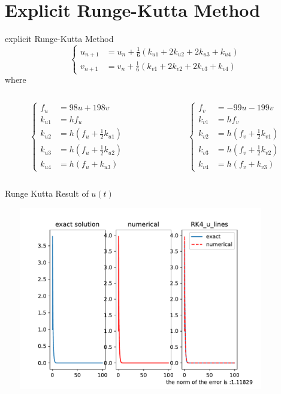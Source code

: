 \documentclass{beamer}
\begin{document}
 \section{Explicit Runge-Kutta Method}
 \begin{frame}{explicit Runge-Kutta Method}
    \[
        \begin{cases}
            u_{n+1} &= u_n +\frac{1}{6}(k_{u1}+2k_{u2}+2k_{u3}+k_{u4})\\
            v_{n+1} &= v_n +\frac{1}{6}(k_{v1}+2k_{v2}+2k_{v3}+k_{v4})
        \end{cases}
        \]
    where 
    \begin{columns}[T] %
        \begin{column}{.48\textwidth}
            \[
                \begin{cases}
                    f_u&=98u+198v\\
                    k_{u1}&=hf_u\\
                    k_{u2}&=h(f_u+\frac{1}{2}k_{u1})\\
                    k_{u3}&=h(f_u+\frac{1}{2}k_{u2})\\
                    k_{u4}&=h(f_u+k_{u3})
                \end{cases}
                \]
    
        \end{column}%
        \hfill%
        \begin{column}{.48\textwidth}
            \[
                \begin{cases}
                    f_v&=-99u-199v\\
                    k_{v1}&=hf_v\\
                    k_{v2}&=h(f_v+\frac{1}{2}k_{v1})\\
                    k_{v3}&=h(f_v+\frac{1}{2}k_{v2})\\
                    k_{v4}&=h(f_v+k_{v3})
                \end{cases}
                \]
        
        \end{column}
    \end{columns}
 \end{frame}
 \begin{frame}{Runge Kutta Result of $u(t)$}

    \centering
    \includegraphics[height=8cm,width=12cm]{RK4_u_lines.pdf}
 \end{frame}
\end{document}
